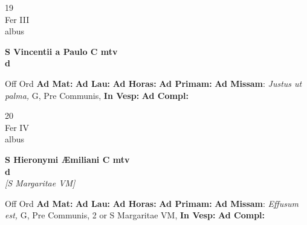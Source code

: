 \documentclass[10pt, openany]{book}
\begin{document}
    \begin{center}
        \begin{minipage}{3.5in}
            \vspace{2em}
            \begin{minipage}{0.5in}
                {\Huge 19} \\
                {\normalsize Fer III} \\
                {\normalsize albus}
            \end{minipage}
            \begin{minipage}{3.0in}
                \textbf{ \large S Vincentii a Paulo C mtv \\
                \textnormal{\normalsize d}} \\ 
            \end{minipage}
            \begin{justify}Off Ord
                \textbf{Ad Mat: }
                \textbf{Ad Lau: }
                \textbf{Ad Horas: }
                \textbf{Ad Primam: }\textbf{Ad Missam}: \textit{Justus ut palma,} G, Pre Communis,  
                \textbf{In Vesp: }
                \textbf{Ad Compl: }
            \end{justify}
        \end{minipage}
    \end{center}

    \begin{center}
        \begin{minipage}{3.5in}
            \vspace{2em}
            \begin{minipage}{0.5in}
                {\Huge 20} \\
                {\normalsize Fer IV} \\
                {\normalsize albus}
            \end{minipage}
            \begin{minipage}{3.0in}
                \textbf{ \large S Hieronymi Æmiliani C mtv \\
                \textnormal{\normalsize d}} \\ \textit{[S Margaritae VM]} \\ 
            \end{minipage}
            \begin{justify}Off Ord
                \textbf{Ad Mat: }
                \textbf{Ad Lau: }
                \textbf{Ad Horas: }
                \textbf{Ad Primam: }\textbf{Ad Missam}: \textit{Effusum est,} G, Pre Communis, 2 or S Margaritae VM,  
                \textbf{In Vesp: }
                \textbf{Ad Compl: }
            \end{justify}
        \end{minipage}
    \end{center}
\end{document}
